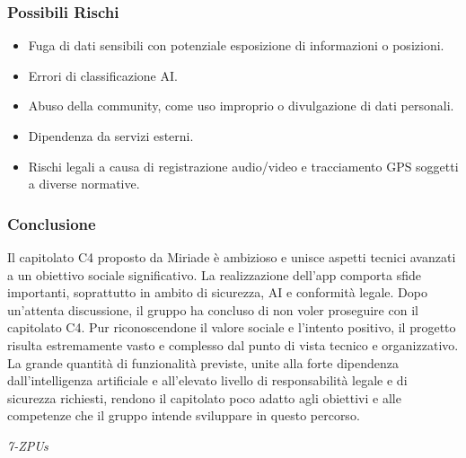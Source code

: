 \documentclass[a4paper,12pt]{article}
\begin{document}
\subsubsection*{Possibili Rischi}
\begin{itemize}[leftmargin=*]
    \item Fuga di dati sensibili con potenziale esposizione di informazioni o posizioni.
    \item Errori di classificazione AI.
    \item Abuso della community, come uso improprio o divulgazione di dati personali.
    \item Dipendenza da servizi esterni.
    \item Rischi legali a causa di registrazione audio/video e tracciamento GPS soggetti a diverse normative.
\end{itemize}

\subsubsection*{Conclusione}
Il capitolato C4 proposto da Miriade è ambizioso e unisce aspetti tecnici avanzati a un obiettivo sociale significativo.  
La realizzazione dell’app comporta sfide importanti, soprattutto in ambito di sicurezza, AI e conformità legale.
Dopo un’attenta discussione, il gruppo ha concluso di non voler proseguire con il capitolato C4.  
Pur riconoscendone il valore sociale e l’intento positivo, il progetto risulta estremamente vasto e complesso dal punto di vista tecnico e organizzativo.  
La grande quantità di funzionalità previste, unite alla forte dipendenza dall'intelligenza artificiale e all’elevato livello di responsabilità legale e di sicurezza richiesti, rendono il capitolato poco adatto agli obiettivi e alle competenze che il gruppo intende sviluppare in questo percorso.

\vspace{0.5cm}

\vfill
\begin{flushright}
    \textit{7-ZPUs}
\end{flushright}
\end{document}
